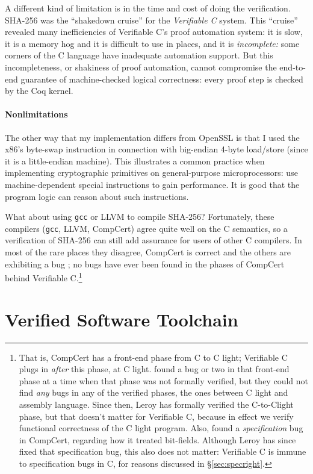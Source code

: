 \documentclass[prodmode,acmtoplas]{acmsmall}
\begin{document}
A different kind of limitation is in the
time and cost of doing the verification.
SHA-256 was the ``shakedown cruise'' for
the \emph{Verifiable C} system.  This
``cruise'' revealed many inefficiencies
of Verifiable C's proof automation system:
it is slow, it is a memory hog
and it is difficult to use in places,
and it is \emph{incomplete:} some corners
of the C language have inadequate 
automation support.  But this incompleteness,
or shakiness of proof automation,
cannot compromise the
end-to-end guarantee of machine-checked
logical correctness: every proof step
is checked by the Coq kernel.

\paragraph{Nonlimitations}
The other way that my implementation
differs from OpenSSL is that I used
the x86's byte-swap instruction
in connection with 
big-endian 4-byte load/store 
(since it is a little-endian machine).
This illustrates a common practice 
when implementing cryptographic
primitives on general-purpose microprocessors:
use machine-dependent special instructions
to gain performance.  It is good that
the program logic can reason about such
instructions.

What about using \texttt{gcc} or LLVM to compile
SHA-256?  Fortunately, these compilers
(\texttt{gcc}, LLVM, CompCert) agree quite well
on the C semantics, so a verification
of SHA-256 can still add assurance for users of 
other C compilers. In most of the rare places they disagree,
CompCert is correct and the others are exhibiting a bug
\cite{yang2012finding}; no bugs have ever been found
in the phases of CompCert behind Verifiable C.\footnote{
That is, CompCert has a front-end phase from C to C light;
Verifiable C plugs in \emph{after} this phase, at C light.
 found a bug or two
in that front-end phase at a time when that
phase was not formally verified, but they could not
find \emph{any} bugs in any of the verified phases,
the ones between C light and assembly language.
Since then, Leroy
has formally verified the C-to-Clight phase,
but that doesn't matter for Verifiable C,
because in effect we verify functional correctness
of the C light program.
Also, 
found a \emph{specification} bug in CompCert, regarding
how it treated bit-fields.  Although Leroy has since
fixed that specification bug, this also does not
matter:  Verifiable C is immune to specification
bugs in C, for reasons discussed in \S\ref{sec:specright}.}
\section{Verified Software Toolchain}
\end{document}

